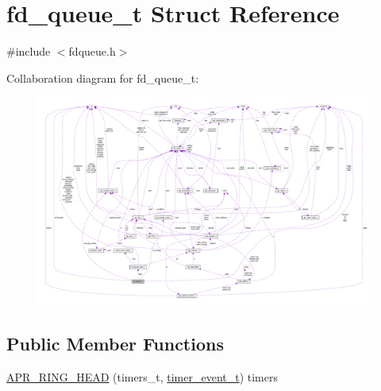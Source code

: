 \hypertarget{structfd__queue__t}{}\section{fd\+\_\+queue\+\_\+t Struct Reference}
\label{structfd__queue__t}


{\ttfamily \#include $<$fdqueue.\+h$>$}



Collaboration diagram for fd\+\_\+queue\+\_\+t\+:
\nopagebreak
\begin{figure}[H]
\begin{center}
\leavevmode
\includegraphics[width=350pt]{structfd__queue__t__coll__graph}
\end{center}
\end{figure}
\subsection*{Public Member Functions}
\begin{DoxyCompactItemize}
\item 
\hyperlink{structfd__queue__t_a76e44a6d158767b9f943ea1533ea2b6e}{A\+P\+R\+\_\+\+R\+I\+N\+G\+\_\+\+H\+E\+AD} (timers\+\_\+t, \hyperlink{structtimer__event__t}{timer\+\_\+event\+\_\+t}) timers
\end{DoxyCompactItemize}
